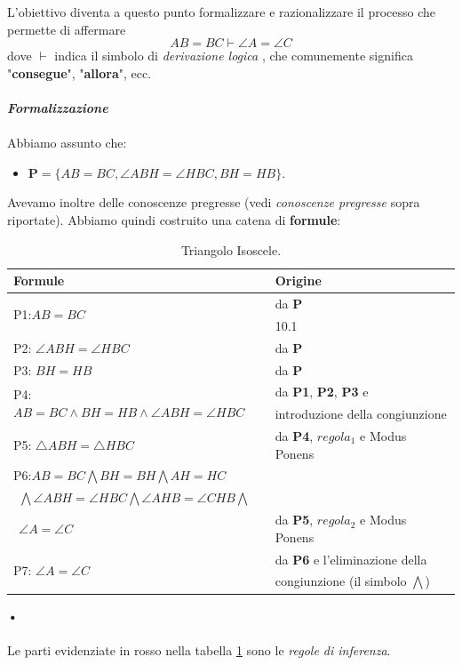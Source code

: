\documentclass[11pt]{article}
\begin{document}
L'obiettivo diventa a questo punto formalizzare e razionalizzare il processo che permette di affermare $$ AB=BC\vdash\angle A = \angle C$$ dove $\vdash$ indica il simbolo di \color{red} \textit{derivazione logica} \color{black}, che comunemente significa "\textbf{consegue}", "\textbf{allora}", ecc.
\\ \\
\textit{\textbf{Formalizzazione}}
\\ \\
Abbiamo assunto che:
\begin{itemize}
\item $\textbf{P} = \{AB=BC, \angle ABH = \angle HBC, BH = HB\}$.
\end{itemize}
Avevamo inoltre delle conoscenze pregresse (vedi \textit{conoscenze pregresse} sopra riportate).
Abbiamo quindi costruito una catena di \textbf{formule}:
\begin{table}[ht]
  \begin{center}
    \caption{Triangolo Isoscele.}
    \label{tab:isoscele}
    \begin{tabular}{l|l}
      \textbf{Formule} & \textbf{Origine} \\
      \hline
      \multirow{2}{*}{P1:$AB=BC$} 	& da \textbf{P} \\ %
      								& 10.1 \\ %
      \hline
      P2: $\angle ABH = \angle HBC$  & da \textbf{P} \\
      \hline
      P3: $BH = HB$ &  da \textbf{P}  \\
      \hline
      \multirow{2}{*}{P4:$AB = BC \wedge BH = HB \wedge \angle ABH = \angle HBC$ } 	& da \textbf{P1}, \textbf{P2}, \textbf{P3} e \\ %
      																				& \color{red} introduzione della congiunzione \color{black} \\
      \hline
      P5: $\bigtriangleup ABH = \bigtriangleup HBC$ & da \textbf{P4}, $regola_{1}$ e \color{red} Modus Ponens \color{black} \\ 
      \hline
      P6:$AB = BC \bigwedge BH = BH \bigwedge AH =HC $ \\ $\medspace \medspace \bigwedge \angle ABH = \angle HBC \bigwedge \angle AHB = \angle CHB \bigwedge $ \\ $\medspace \medspace  \angle A = \angle C$	& da \textbf{P5}, $regola_2$  e \color{red} Modus Ponens \color{black}  \\
      \hline
      \multirow{2}{*}{P7: $\angle A = \angle C$} & da \textbf{P6} e l'\color{red}eliminazione della \\ &\color{red} congiunzione\color{black} (il simbolo $\bigwedge$)
    \end{tabular}
  \end{center}
\end{table}\textbf{•}
\\ \\
Le parti evidenziate in rosso nella tabella \ref{tab:isoscele} sono le \emph{regole di inferenza}.
\end{document}
